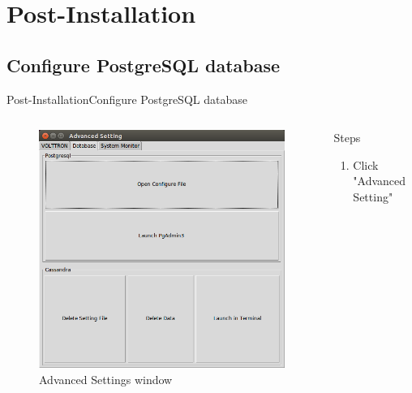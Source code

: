 \documentclass{beamer}
\begin{document}
\section{Post-Installation}

\subsection{Configure PostgreSQL database}
\begin{frame}{Post-Installation}{Configure PostgreSQL database}
\begin{columns}[T]
	\begin{column}{0.5\textwidth}
		\begin{figure}
			\includegraphics[scale=0.2]{../figs/advancedSettings.png}
			\caption{Advanced Settings window}
		\end{figure}
	\end{column}
	\begin{column}{0.5\textwidth}
		\begin{block}{Steps}
			\begin{enumerate}	
				\item Click "Advanced Setting"
			\end{enumerate}		
		\end{block}
	\end{column}
\end{columns}
\end{frame}
\end{document}
